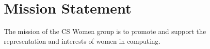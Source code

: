 \section{Mission Statement}
\label{sec:mission}
The mission of the CS Women group is to promote and support the representation and interests of women in computing.

